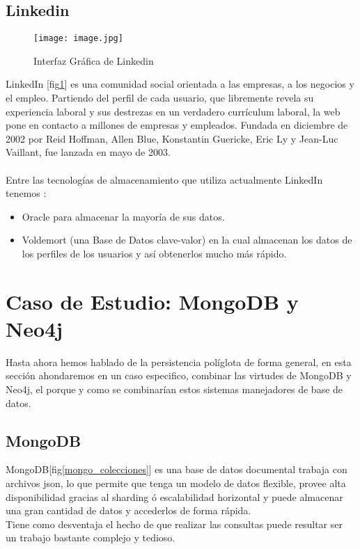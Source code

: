 \documentclass[conference,compsoc]{IEEEtran}
\begin{document}
\subsection{Linkedin}

\begin{figure}[!h]
\centering
\texttt{[image: image.jpg]}
\caption{Interfaz Gráfica de Linkedin}
\label{linkedin}
\end{figure}

LinkedIn [fig\ref{linkedin}] es una comunidad social orientada a las empresas, a los negocios y el empleo. Partiendo del perfil de cada usuario, que libremente revela su experiencia laboral y sus destrezas en un verdadero currículum laboral, la web pone en contacto a millones de empresas y empleados. Fundada en diciembre de 2002 por Reid Hoffman, Allen Blue, Konstantin Guericke, Eric Ly y Jean-Luc Vaillant, fue lanzada en mayo de 2003.\cite{art8}
\\
\\

Entre las tecnologías de almacenamiento que utiliza actualmente LinkedIn tenemos \cite{art9}:
\begin{itemize}
\item Oracle para almacenar la mayoría de sus datos.
\item Voldemort (una Base de Datos clave-valor) en la cual almacenan los datos de los perfiles de los usuarios y así obtenerlos mucho más rápido.
\end{itemize}


\section{Caso de Estudio: MongoDB y Neo4j}
Hasta ahora hemos hablado de la persistencia políglota de forma general, en esta sección ahondaremos en un caso especifico, combinar las virtudes de MongoDB y Neo4j, el porque y como se combinarían estos sistemas manejadores de base de datos.
\subsection{MongoDB}
MongoDB[fig\ref{mongo_colecciones}] es una base de datos documental trabaja con archivos json, lo que permite que tenga un modelo de datos flexible, provee alta disponibilidad gracias al sharding ó escalabilidad horizontal y puede almacenar una gran cantidad de datos y accederlos de forma rápida.\cite{art1}
\\
Tiene como desventaja el hecho de que realizar las consultas puede resultar ser un trabajo bastante complejo y tedioso. 
\end{document}
